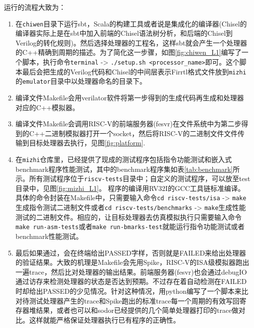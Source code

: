 运行的流程大致为：
\begin{enumerate}[label=(\alph*)]
	\item 在\texttt{chiwen}目录下运行sbt，Scala的构建工具或者说是集成化的编译器(Chisel的编译器实际上是在sbt中加入前端的Chisel语法树分析，和后端的Chisel到Verilog的转化规则)。然后选择处理器的工程名，这样sbt就会产生一个处理器的C++精确到周期的描述。为了简化这一步骤，如图\ref{fig:chiwen_L1}编写了一个脚本，执行命令{\footnotesize \verb|terminal| -> \verb|./setup.sh <processor_name>|}即可。这个脚本最后会把生成的Verilog代码和Chisel的中间层表示Firrtl格式文件放到\texttt{mizhi}的\texttt{emulator}目录中以处理器命名的目录下。
	\item 编译文件Makefile会用verilator软件将第一步得到的生成代码再生成和处理器对应的C++模拟器。
	\item 编译文件Makefile会调用RISC-V的前端服务器(fesvr)在文件系统中为第二步得到的C++二进制模拟器打开一个socket，然后将RISC-V的二进制文件文件传输到目标处理器去执行，见图\ref{fig:platform}.
	\item 在\texttt{mizhi}仓库里，已经提供了现成的测试程序包括指令功能测试和嵌入式benchmark程序性能测试，其中的benchmark程序集如表\ref{tab:benchmark}所示。所有测试程序位于\texttt{riscv-tests}目录中；自定义的测试程序，可以放至test目录中，见图\ref{fig:mizhi_L1}。 程序的编译用RV32I的GCC工具链标准编译。具体的命令封装在Makefile中，只需要输入命令{\footnotesize \verb|cd riscv-tests/isa| -> \verb|make|}生成指令测试二进制文件或者{\footnotesize \verb|cd riscv-tests/benchmarks| -> \verb|make|}生成性能测试的二进制文件。相应的，让目标处理器去仿真模拟执行只需要输入命令{\footnotesize \verb|make run-asm-tests|}或者{\footnotesize \verb|make run-bmarks-test|}就能运行指令功能测试或者benchmark性能测试。
	\item 最后如果通过，会在终端给出PASSED字样，否则就是FAILED来给出处理器的验证结果。大致的机理是Makefile会先用Spike，RISC-V的ISA级模拟器跑出一遍trace，然后比对处理器的输出结果。前端服务器(fesvr)也会通过debugIO通过访存来检测处理器的状态是否达到预期。不过存在着自动检测在FAILED时却给出PASSED的少见情况。针对这种情况，用python编写了一个脚本来比对待测试处理器产生的trace和Spike跑出的标准trace每一个周期的有效写回寄存器堆结果，或者也可以和sodor已经提供的几个简单处理器打印的trace做对比。这样就能严格保证处理器执行已有程序的正确性。
\end{enumerate}

